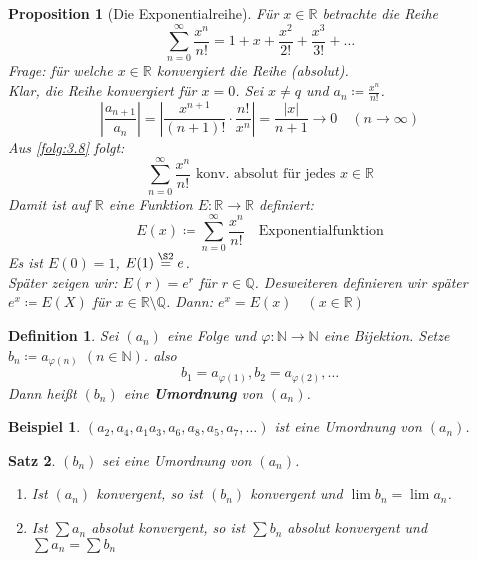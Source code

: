 \documentclass[titlepage,ngerman,a4paper,headsepline,DIV15,halfparskip*,14pt]{scrartcl}
\newcommand{\R}{\mathbb{R}}
\newcommand{\N}{\mathbb{N}}
\newcommand{\Q}{\mathbb{Q}}
\theoremstyle{dotless}
\newtheorem{satz}{Satz}[section]
\newtheorem{prop}[satz]{Proposition}
\newtheorem*{definition}{Definition}
\newtheorem*{beispiel*}{Beispiel}
\begin{document}
 
\begin{prop}[Die Exponentialreihe] \label{prop:3.9-Exponentialreihe}
	Für $x \in \R$ betrachte die Reihe 
	$$ \sum_{n=0}^{\infty} \frac{x^{n}}{n!} = 1 + x + \frac{x^{2}}{2!} + \frac{x^{3}}{3!} + \dotsc $$
	Frage: für welche $x \in \R$ konvergiert die Reihe (absolut). \\
	Klar, die Reihe konvergiert für $x = 0$. Sei $x \ne q$ und $a_{n} \coloneqq \frac{x^{n}}{n!}$.
		$$ \left| \frac{a_{n+1}}{a_{n}} \right| = \left| \frac{x^{n+1}}{(n+1)!} \cdot \frac{n!}{x^{n}} \right| = \frac{|x|}{n+1} \rightarrow 0 \quad (n \rightarrow \infty) $$
	Aus \ref{folg:3.8} folgt:
		$$ \sum_{n=0}^{\infty} \frac{x^{n}}{n!} \text{ konv. absolut für jedes } x \in \R $$
	Damit ist auf $\R$ eine Funktion $E \colon \R \rightarrow \R$ definiert:
		$$ E(x) \coloneqq \sum_{n=0}^{\infty} \frac{x^{n}}{n!} \quad \text{Exponentialfunktion} $$
	Es ist $E(0) = 1$, $E(1) \overset{\S 2}{=} e$. \\
	Später zeigen wir: $E(r) = e^{r}$ für $r \in \Q$. Desweiteren definieren wir später $e^{x} \coloneqq E(X)$ für $x \in \R \setminus \Q$. Dann: $e^{x} = E(x) \quad (x \in \R)$
\end{prop}

\begin{definition}
	Sei $(a_{n})$ eine Folge und $\varphi \colon \N \rightarrow \N$ eine Bijektion. Setze $b_{n} \coloneqq a_{\varphi(n)}$ $(n \in \N)$. also 
		$$ b_{1} = a_{\varphi(1)}, b_{2} = a_{\varphi(2)}, \dotsc $$
	Dann hei{\ss}t $(b_{n})$ eine \textbf{Umordnung} von $(a_{n})$.
\end{definition}

\begin{beispiel*}
$(a_{2}, a_{4}, a_{1} a_{3}, a_{6}, a_{8}, a_{5}, a_{7}, \dotsc)$ ist eine Umordnung von $(a_{n})$.	
\end{beispiel*}


\begin{satz} \label{satz:3.10}
	$(b_{n})$ sei eine Umordnung von $(a_{n})$.
	\begin{enumerate}
		\item Ist $(a_{n})$ konvergent, so ist $(b_{n})$ konvergent und $\lim b_{n} = \lim a_{n}$.
		\item Ist $\sum a_{n}$ absolut konvergent, so ist $\sum b_{n}$ absolut konvergent und $\sum a_{n} = \sum b_{n}$
	\end{enumerate}	
\end{satz}
\end{document}
